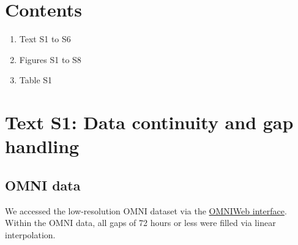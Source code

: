 \documentclass{agujournal2018}
\begin{document}
\renewcommand{\thetable}{S\arabic{table}}
\renewcommand{\thefigure}{S\arabic{figure}}







%
%

\section*{Contents}
\begin{enumerate}
\item Text S1 to S6
\item Figures S1 to S8
\item Table S1
\end{enumerate}

\section*{Text S1: Data continuity and gap handling}\label{sec:datahandling}

\subsection*{OMNI data}\label{sec:OMNIsupp}
We accessed the low-resolution OMNI dataset via the \href{https://omniweb.gsfc.nasa.gov/ow.html}{OMNIWeb interface}. Within the OMNI data, all gaps of 72 hours or less were filled via linear interpolation.
\end{document}
